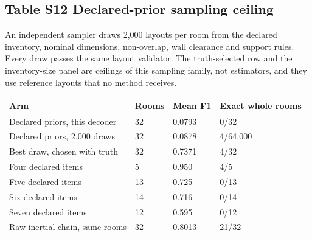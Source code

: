 \documentclass[10pt,letterpaper]{article}
\begin{document}
\begin{minipage}{\linewidth}\subsection*{Table S12 Declared-prior sampling ceiling}
An independent sampler draws 2,000 layouts per room from the declared
inventory, nominal dimensions, non-overlap, wall clearance and support
rules. Every draw passes the same layout validator. The truth-selected
row and the inventory-size panel are ceilings of this sampling family,
not estimators, and they use reference layouts that no method receives.

\begin{center}\small\begin{tabular}{@{}p{}p{}p{}p{}@{}}\toprule
\textbf{Arm} & \textbf{Rooms} & \textbf{Mean F1} & \textbf{Exact whole rooms} \\ \midrule
Declared priors, this decoder & 32 & 0.0793 & 0/32 \\
Declared priors, 2,000 draws & 32 & 0.0878 & 4/64,000 \\
Best draw, chosen with truth & 32 & 0.7371 & 4/32 \\
Four declared items & 5 & 0.950 & 4/5 \\
Five declared items & 13 & 0.725 & 0/13 \\
Six declared items & 14 & 0.716 & 0/14 \\
Seven declared items & 12 & 0.595 & 0/12 \\
Raw inertial chain, same rooms & 32 & 0.8013 & 21/32 \\
\bottomrule\end{tabular}\end{center}
\end{minipage}\par\medskip
\end{document}
